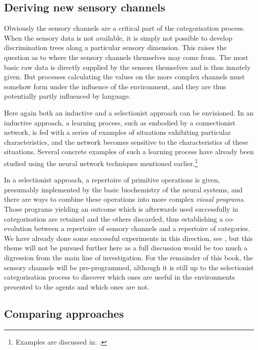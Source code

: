 \subsection{Deriving new sensory channels}

Obviously the sensory channels are a critical 
part of the categorisation process. When the sensory data is 
not available, it is simply not possible to develop 
discrimination trees along a particular sensory dimension. 
This raises the question as to where the sensory channels
themselves may come from. 
The most basic raw data is directly supplied by
the sensors themselves and is thus innately given. But 
processes calculating the values on 
the more complex channels must somehow form under the 
influence of the environment, and they are
thus potentially partly influenced by language. 

Here again both an inductive and a selectionist approach
can be envisioned. In an inductive approach, a learning
process, such as embodied by a connectionist network, 
is fed with a series of examples of situations 
exhibiting particular characteristics, and the network 
becomes sensitive to the characteristics of these
situations. Several concrete examples of such a 
learning process have already been studied 
using the neural network techniques mentioned earlier.\footnote{
Examples are discussed in: \cite{Linsker:1990}.} 

In a selectionist approach, a repertoire of primitive operations
is given, presumably implemented by the 
basic biochemistry of the neural systems, and there are
ways to combine these operations into more complex
{\it visual programs}. Those
programs yielding an outcome which
is afterwards used successfully in categorisation are 
retained and the others discarded, thus establishing 
a co-evolution between a repertoire of sensory channels
and a repertoire of 
categories. We have already done some successful experiments 
in this direction, see \cite{Dejong:1999},  
but this theme will not be pursued further here as a full discussion 
would be too much a digression from the main line
of investigation. For the remainder of this book,
the sensory channels will be pre-programmed, 
although it is still up to the selectionist 
categorisation process to discover which ones are useful
in the environments presented to the agents and which 
ones are not. 

\subsection{Comparing approaches}

